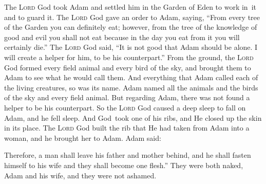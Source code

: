 \begin{inparaenum}
   The \textsc{Lord} God took Adam and settled him in the Garden of Eden to work in\understood\ it and to guard it.%
   The \textsc{Lord} God gave an order to Adam, saying, ``From every tree of the Garden you can definitely eat;%
   however, from the tree of the knowledge of good and evil you shall not eat because in the day you eat from it you will certainly die.''%
   The \textsc{Lord} God said, ``It is not good that Adam should be alone. I will create a helper for him, to be his counterpart.''%
   From the ground, the \textsc{Lord} God formed every field animal and every bird of the sky, and brought them to Adam to see what he would call them. And everything that Adam called each of the living creatures, so was its name.%
   Adam named all the animals and the birds of the sky and every field animal. But regarding Adam, there was not found a helper to be his counterpart.%
   So the \textsc{Lord} God caused a deep sleep to fall on Adam, and he fell sleep. And God\understood\ took one of his ribs, and He closed up the skin in its place.%
   The \textsc{Lord} God built the rib that He had taken from Adam into a woman, and he brought her to Adam.%
   Adam said:%
  
  
  
   Therefore, a man shall leave his father and mother behind, and he shall fasten himself to his wife and they shall become one flesh.''%
   They were both naked, Adam and his wife, and they were not ashamed.%
\end{inparaenum}

